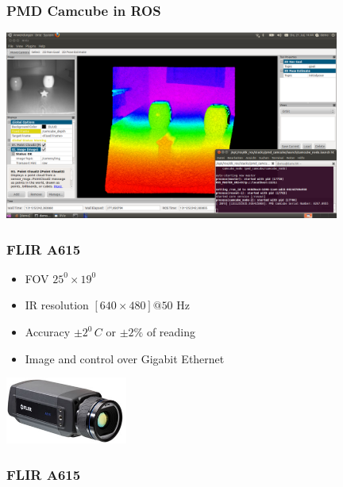 \begin{frame}
 \frametitle{PMD Camcube in ROS}
\includegraphics[width=11cm]{images/camcube_ros.png}
\end{frame}

\begin{frame}
 \frametitle{FLIR A615}
\begin{itemize}
  \item FOV $25^0 \times 19^0$
  \item IR resolution $[640 \times 480]@50$ Hz
  \item Accuracy $\pm 2^0\,C$ or $\pm 2\%$ of reading
  \item Image and control over Gigabit Ethernet
\end{itemize}

\vspace{5ex}\hspace{37ex}\includegraphics[width=4cm]{images/A615_300.jpg}
\end{frame}

\begin{frame}
 \frametitle{FLIR A615}
\end{frame}

